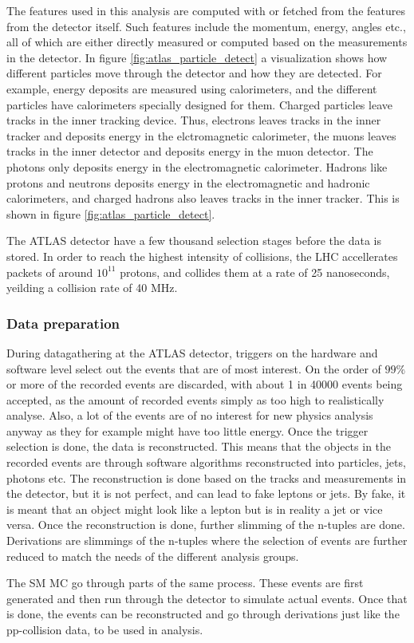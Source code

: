 The features used in this analysis are computed with or fetched from the features from the 
detector itself. Such features include the momentum, energy, angles etc., 
all of which are either directly measured or computed based on the measurements in the 
detector. In figure \ref{fig:atlas_particle_detect} a visualization shows how
different particles move through the detector and how they are detected. For example, 
energy deposits are measured using calorimeters, and the different particles 
have calorimeters specially designed for them. Charged particles leave tracks in the 
inner tracking device. Thus, electrons leaves tracks in the inner tracker and deposits energy 
in the elctromagnetic calorimeter, the muons leaves tracks in the inner detector and 
deposits energy in the muon detector. The photons only deposits energy in the electromagnetic 
calorimeter. Hadrons like protons and neutrons deposits energy in the electromagnetic and 
hadronic calorimeters, and charged hadrons also leaves tracks in the inner tracker. This is 
shown in figure \ref{fig:atlas_particle_detect}.\par

The ATLAS detector have a few thousand selection stages before the data is stored. 
In order to reach the highest intensity of collisions, the LHC accellerates
packets of around $10^{11}$ protons, and collides them at a rate of 25 nanoseconds, 
yeilding a collision rate of 40 MHz\cite{Wang:2707056}. \cite{Bernius:2707054}



\subsubsection*{Data preparation}
During datagathering at the ATLAS detector, triggers on the hardware and software level select out the events that are of most interest. On the order of $99 \%$ or
 more of the recorded events are discarded, with about 1 in 40000 events being accepted, as the amount of recorded events simply as too high to realistically analyse. Also, a lot of the events are of no 
 interest for new physics analysis anyway as they for example might have too little energy. Once the trigger selection is done, the data is reconstructed. This means that the objects
 in the recorded events are through software algorithms reconstructed into particles, jets, photons etc. The reconstruction is done based on the tracks and measurements
 in the detector, but it is not perfect, and can lead to fake leptons or jets. By fake, it is meant that an object might look like a lepton but is in reality a jet or vice versa\cite{Gillam:2015kta}.
 Once the reconstruction is done, further slimming of the n-tuples are done. Derivations are slimmings of the n-tuples where the selection of events are further reduced 
 to match the needs of the different analysis groups. \par 
The SM MC go through parts of the same process. These events are first generated and then run through the detector to simulate actual events. Once that is done, the events
 can be reconstructed and go through derivations just like the pp-collision data, to be used in analysis. 

